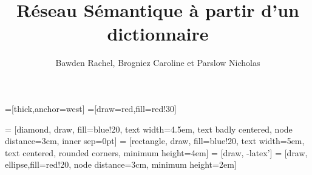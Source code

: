 \documentclass[a4paper, 12pt]{article}
\title{Réseau Sémantique à partir d'un dictionnaire}
\author{Bawden Rachel, Brogniez Caroline et Parslow Nicholas}
\date{}
\begin{document}
=[thick,anchor=west]
=[draw=red,fill=red!30]

 = [diamond, draw, fill=blue!20, 
    text width=4.5em, text badly centered, node distance=3cm, inner sep=0pt]
 = [rectangle, draw, fill=blue!20, 
    text width=5em, text centered, rounded corners, minimum height=4em]
 = [draw, -latex']
 = [draw, ellipse,fill=red!20, node distance=3cm,
    minimum height=2em]

\maketitle




























\end{document}
